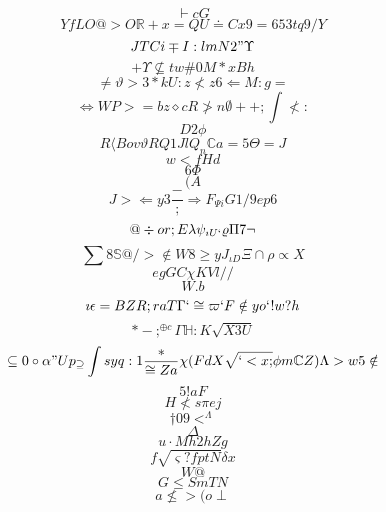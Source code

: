 \documentclass[12pt]{article}
\begin{document}
        \begin{minipage}[t][0pt]{\linewidth}

        \[\vdash c G\]
\[YfLO@>O\mathbb{R} + x = Q U\doteq C x 9 = 6 5 3 t q 9 / Y\]
\[JTCi\mp I : l m N 2 "\Upsilon\]
\[+\Upsilon\nsubseteq t w\# 0 M * x B h\]
\[\neq\vartheta > 3 * k {U:z}\nless z 6\Leftarrow M : g =\]
\[\Leftrightarrow W P > = b z\diamond c R\ngtr n\emptyset + + ;\int\nless :\]
\[D2\phi\]
\[R\langle B o v\vartheta R Q 1 J l Q_{n}\mathbb{C} a = 5\Theta = J\]
\[w<fHd\]
\[6\Phi\]
\[(A\]
\[J>\Longleftarrow y 3\frac{-}{;}\Longrightarrow F_{\Psi i} G 1 / 9 e p 6\]
\[@\div o r ; E\lambda\psi_{\imath U `}\varrho\Pi 7\neg\]
\[\sum 8\mathbb{S} @ / >\notin W 8\geq y J_{\iota D}\Xi {\cap}\rho\propto X\]
\[egGC\chi K V l / /\]
\[W.b\]
\[\imath\epsilon = B Z R ; r a T\Gamma `\cong\varpi ` F\notin y o ` ! w ? h\]
\[*-;^{\oplus c}\Gamma\mathbb{H} : K\sqrt{X3U}\]
\[\subseteq 0\circ\alpha " U p_{\supseteq}\int s y q : 1\frac{*}{\cong Z a}\chi ( F d X\sqrt{`<x;}\phi m\mathbb{C} Z )\Lambda > w 5\notin\]
\[5!aF\]
\[H\nless s\pi e j\]
\[\dagger 0 9 <^{\Lambda}\]
\[\Delta\]
\[u\cdot M h 2 {hZg}\]
\[f\sqrt{\varsigma ? f p t N}\delta x\]
\[W@\]
\[G\leq {SmTN}\]
\[a\nleq > ( o\perp
        \]
\end{minipage}
\end{document}
